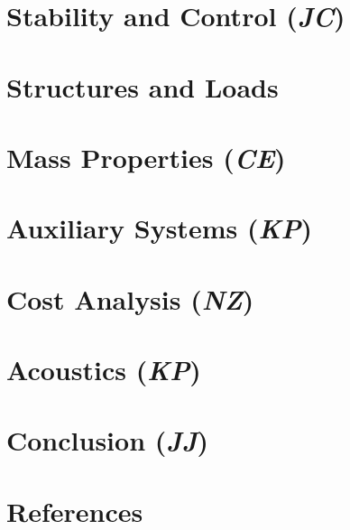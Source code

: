 \documentclass[conf]{new-aiaa}
\begin{document}
\clearpage
\section{Stability and Control (\textit{JC})}
\label{section: Stab and Control}


\clearpage
\section{Structures and Loads}
\label{section: Structures and Loads}


\clearpage
\section{Mass Properties (\textit{CE})}
\label{section: Mass Properties}


%

\clearpage
\section{Auxiliary Systems (\textit{KP})}
\label{section: Systems}


\clearpage
\section{Cost Analysis (\textit{NZ})}    
\label{section: Cost}


\clearpage
\section{Acoustics (\textit{KP})}    
\label{section: Acoustics}



\clearpage
\section{Conclusion (\textit{JJ})}
\label{section: Conclusion}



\label{section: Requirements}


\newpage
\section{References}

\end{document}
